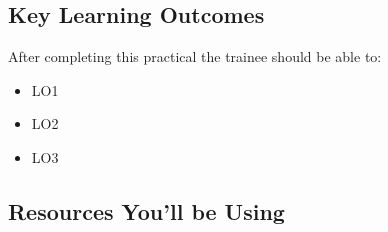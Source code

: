 



\chapter{\moduleTitle}


\newpage


\section{Key Learning Outcomes}

After completing this practical the trainee should be able to:

\begin{itemize}
  \item LO1 
  \item LO2 
  \item LO3
\end{itemize}


\section{Resources You'll be Using}


